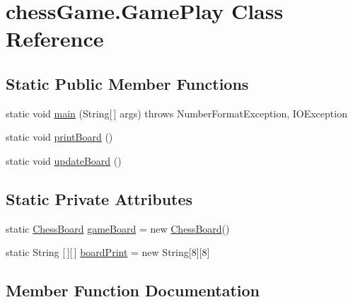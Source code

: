 \hypertarget{classchess_game_1_1_game_play}{}\section{chess\+Game.\+Game\+Play Class Reference}
\label{classchess_game_1_1_game_play}
\subsection*{Static Public Member Functions}
\begin{DoxyCompactItemize}
\item 
static void \hyperlink{classchess_game_1_1_game_play_a5df5d93db1a8cd944ca116063ab64196}{main} (String\mbox{[}$\,$\mbox{]} args)  throws Number\+Format\+Exception, I\+O\+Exception 	
\item 
static void \hyperlink{classchess_game_1_1_game_play_a17d6ffb57cf60b47615e278c4211a2cb}{print\+Board} ()
\item 
static void \hyperlink{classchess_game_1_1_game_play_a5b8a3677974126f68f771a790f411163}{update\+Board} ()
\end{DoxyCompactItemize}
\subsection*{Static Private Attributes}
\begin{DoxyCompactItemize}
\item 
static \hyperlink{classchess_game_1_1_chess_board}{Chess\+Board} \hyperlink{classchess_game_1_1_game_play_ab465d3af100bd584fa473e5cd0b06b78}{game\+Board} = new \hyperlink{classchess_game_1_1_chess_board}{Chess\+Board}()
\item 
static String \mbox{[}$\,$\mbox{]}\mbox{[}$\,$\mbox{]} \hyperlink{classchess_game_1_1_game_play_a5e948d1c0d0dd5f9ec2c08077015e632}{board\+Print} = new String\mbox{[}8\mbox{]}\mbox{[}8\mbox{]}
\end{DoxyCompactItemize}


\subsection{Member Function Documentation}
\hypertarget{classchess_game_1_1_game_play_a5df5d93db1a8cd944ca116063ab64196}{}\label{classchess_game_1_1_game_play_a5df5d93db1a8cd944ca116063ab64196} 
